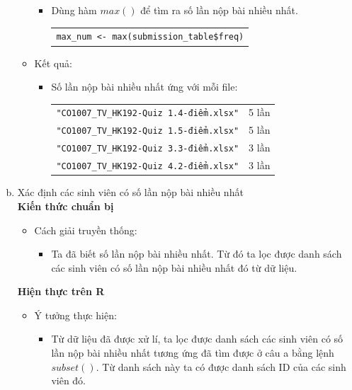\documentclass[a4paper]{article}
\theoremstyle{definition}
\begin{document}
\begin{enumerate}[a)]
\begin{itemize}
\begin{itemize}
            \item Dùng hàm $max()$ để tìm ra số lần nộp bài nhiều nhất.
            \begin{center}
                \begin{tabular}{p{13cm}}
                    \texttt{max\_num <- max(submission\_table\$freq)}
                \end{tabular}
            \end{center}
        \end{itemize}
        \item Kết quả:
        \begin{itemize}
            \item Số lần nộp bài nhiều nhất ứng với mỗi file:
            \begin{center}
                \begin{tabular}{l l}
                     \texttt{"CO1007\_TV\_HK192-Quiz 1.4-điểm.xlsx"} & 5 lần\\ 
                     \texttt{"CO1007\_TV\_HK192-Quiz 1.5-điểm.xlsx"} & 5 lần\\ 
                     \texttt{"CO1007\_TV\_HK192-Quiz 3.3-điểm.xlsx"} & 3 lần\\ 
                     \texttt{"CO1007\_TV\_HK192-Quiz 4.2-điểm.xlsx"} & 3 lần\\ 
                \end{tabular}
            \end{center}
        \end{itemize}
    \end{itemize}
    \bf\item {Xác định các sinh viên có số lần nộp bài nhiều nhất}\\[6pt]
    \bf Kiến thức chuẩn bị\normalfont
    \begin{itemize}
        \item Cách giải truyền thống:
        \begin{itemize}
            \item Ta đã biết số lần nộp bài nhiều nhất. Từ đó ta lọc được danh sách các sinh viên có số lần nộp bài nhiều nhất đó từ dữ liệu.
        \end{itemize}
    \end{itemize}
    \bf Hiện thực trên R\normalfont
    \begin{itemize}
        \item Ý tưởng thực hiện:
        \begin{itemize}
            \item Từ dữ liệu đã được xử lí, ta lọc được danh sách các sinh viên có số lần nộp bài nhiều nhất tương ứng đã tìm được ở câu a bằng lệnh $subset()$. Từ danh sách này ta có được danh sách ID của các sinh viên đó.

\end{itemize}
\end{itemize}
\end{enumerate}
\end{document}
